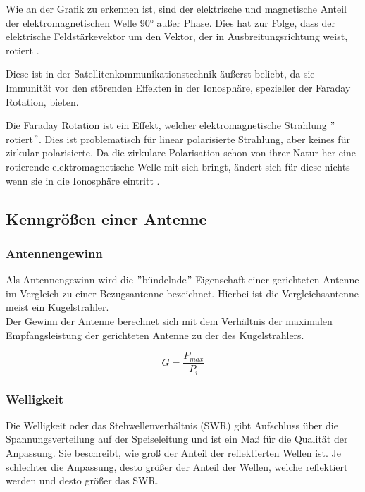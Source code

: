 Wie an der Grafik zu erkennen ist, sind der elektrische und magnetische Anteil der elektromagnetischen Welle 90° außer Phase. Dies hat zur Folge, dass der elektrische Feldstärkevektor um den Vektor, der in Ausbreitungsrichtung weist, rotiert \cite{noauthor_classification_nodate}.

Diese ist in der Satellitenkommunikationstechnik äußerst beliebt, da sie Immunität vor den störenden Effekten in der Ionosphäre, spezieller der Faraday Rotation, bieten.

Die Faraday Rotation ist ein Effekt, welcher elektromagnetische Strahlung $"$rotiert$"$. Dies ist problematisch für linear polarisierte Strahlung, aber keines für zirkular polarisierte. Da die zirkulare Polarisation schon von ihrer Natur her eine rotierende elektromagnetische Welle mit sich bringt, ändert sich für diese nichts wenn sie in die Ionosphäre eintritt \cite{takashi_encyclopedia_2003}.

\subsection{Kenngrößen einer Antenne}

\subsubsection{Antennengewinn}
Als Antennengewinn wird die $"$bündelnde$"$ Eigenschaft einer gerichteten Antenne im Vergleich zu einer Bezugsantenne bezeichnet. Hierbei ist die Vergleichsantenne meist ein Kugelstrahler.\\

Der Gewinn der Antenne berechnet sich mit dem Verhältnis der maximalen Empfangsleistung der gerichteten Antenne zu der des Kugelstrahlers\cite[26]{Kraus-2002-AntennasB}.

\begin{equation}
	G=\frac{P_{max}}{P_{i}}
\end{equation}

\subsubsection{Welligkeit}
Die Welligkeit oder das Stehwellenverhältnis (SWR) gibt Aufschluss über die Spannungsverteilung auf der Speiseleitung und ist ein Maß für die Qualität der Anpassung. Sie beschreibt, wie groß der Anteil der reflektierten Wellen ist. Je schlechter die Anpassung, desto größer der Anteil der Wellen, welche reflektiert werden und desto größer das SWR.\\

